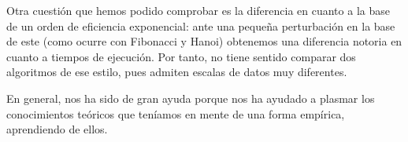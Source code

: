 \documentclass[12pt]{article}
\begin{document}
    Otra cuestión que hemos podido comprobar es la diferencia en cuanto a la base de un orden de eficiencia exponencial: ante una pequeña perturbación en la base de este (como ocurre con Fibonacci y Hanoi) obtenemos una diferencia notoria en cuanto a tiempos de ejecución. Por tanto, no tiene sentido comparar dos algoritmos de ese estilo, pues admiten escalas de datos muy diferentes. 

    En general, nos ha sido de gran ayuda porque nos ha ayudado a plasmar los conocimientos teóricos que teníamos en mente de una forma empírica, aprendiendo de ellos.
\end{document}
